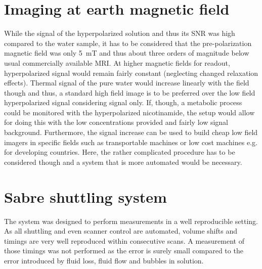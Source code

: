     \section{Imaging at earth magnetic field}
        While the signal of the hyperpolarized solution and thus its SNR was high compared to the water sample, it has to be considered that the pre-polarization magnetic field was only \SI{5}{\milli\tesla} and thus about three orders of magnitude below usual commercially available MRI. At higher magnetic fields for readout, hyperpolarized signal would remain fairly constant (neglecting changed relaxation effects). Thermal signal of the pure water would increase linearly with the field though and thus, a standard high field image is to be preferred over the low field hyperpolarized signal considering signal only. If, though, a metabolic process could be monitored with the hyperpolarized nicotinamide, the setup would allow for doing this with the low concentrations provided and fairly low signal background. Furthermore, the signal increase can be used to build cheap low field imagers in specific fields such as transportable machines or low cost machines e.g. for developing countries. Here, the rather complicated procedure has to be considered though and a system that is more automated would be necessary.
    \section{Sabre shuttling system}
        The system was designed to perform measurements in a well reproducible setting. As all shuttling and even scanner control are automated, volume shifts and timings are very well reproduced within consecutive scans. A measurement of those timings was not performed as the error is surely small compared to the error introduced by fluid loss, fluid flow and bubbles in solution.
